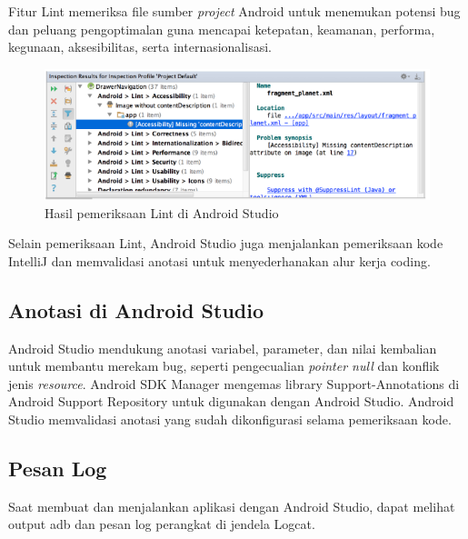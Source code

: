 \begin{enumerate}
    \par Fitur Lint memeriksa file sumber \textit{project} Android  untuk menemukan potensi bug dan peluang pengoptimalan guna mencapai ketepatan, keamanan, performa, kegunaan, aksesibilitas, serta internasionalisasi.
     \begin{figure}[H]
    \centering
    \includegraphics[width=1\textwidth]{figures/android11.png}
    \caption{Hasil pemeriksaan Lint di Android Studio}
    \label{print}
    \end{figure}
    \par Selain pemeriksaan Lint, Android Studio juga menjalankan pemeriksaan kode IntelliJ dan memvalidasi anotasi untuk menyederhanakan alur kerja coding.
\end{enumerate}
\subsection{Anotasi di Android Studio}
\par Android Studio mendukung anotasi variabel, parameter, dan nilai kembalian untuk membantu merekam bug, seperti pengecualian \textit{pointer null} dan konflik jenis \textit{resource}. Android SDK Manager mengemas library Support-Annotations di Android Support Repository untuk digunakan dengan Android Studio. Android Studio memvalidasi anotasi yang sudah dikonfigurasi selama pemeriksaan kode.
\subsection{Pesan Log}
\par Saat membuat dan menjalankan aplikasi dengan Android Studio, dapat melihat output adb dan pesan log perangkat di jendela Logcat.
